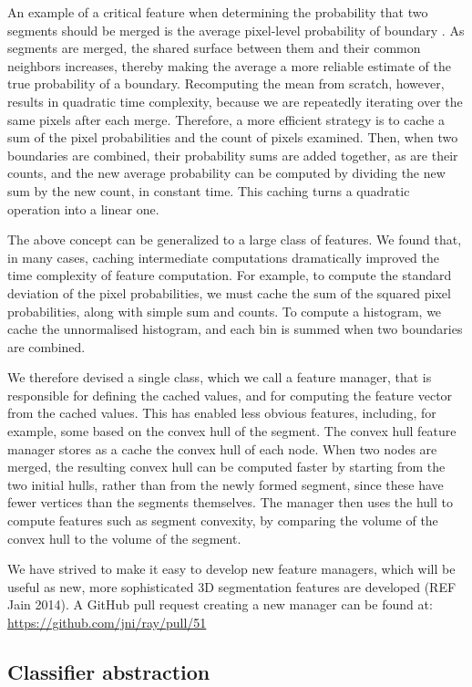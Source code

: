 \documentclass{frontiersSCNS} %
\begin{document}
An example of a critical feature when determining the probability that two segments should be merged is the average pixel-level probability of boundary \citep{Ren:2003jg}.
As segments are merged, the shared surface between them and their common neighbors increases, thereby making the average a more reliable estimate of the true probability of a boundary.
Recomputing the mean from scratch, however, results in quadratic time complexity, because we are repeatedly iterating over the same pixels after each merge.
Therefore, a more efficient strategy is to cache a sum of the pixel probabilities and the count of pixels examined.
Then, when two boundaries are combined, their probability sums are added together, as are their counts, and the new average probability can be computed by dividing the new sum by the new count, in constant time.
This caching turns a quadratic operation into a linear one.

The above concept can be generalized to a large class of features.
We found that, in many cases, caching intermediate computations dramatically improved the time complexity of feature computation.
For example, to compute the standard deviation of the pixel probabilities, we must cache the sum of the squared pixel probabilities, along with simple sum and counts.
To compute a histogram, we cache the unnormalised histogram, and each bin is summed when two boundaries are combined.

We therefore devised a single class, which we call a feature manager, that is responsible for defining the cached values, and for computing the feature vector from the cached values.
This has enabled less obvious features, including, for example, some based on the convex hull of the segment.
The convex hull feature manager stores as a cache the convex hull of each node.
When two nodes are merged, the resulting convex hull can be computed faster by starting from the two initial hulls, rather than from the newly formed segment, since these have fewer vertices than the segments themselves.
The manager then uses the hull to compute features such as segment convexity, by comparing the volume of the convex hull to the volume of the segment.

We have strived to make it easy to develop new feature managers, which will be useful as new, more sophisticated 3D segmentation features are developed (REF Jain 2014).
A GitHub pull request creating a new manager can be found at:
\url{https://github.com/jni/ray/pull/51}

\subsection{Classifier abstraction}
\end{document}
